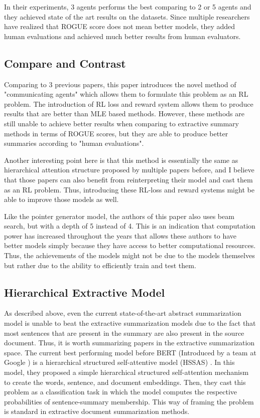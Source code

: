 \documentclass[11pt,a4paper]{article}
\begin{document}
In their experiments, 3 agents performs the best comparing to 2 or 5 agents and they achieved state of the art results on the datasets. Since multiple researchers have realized that ROGUE score does not mean better models, they added human evaluations and achieved much better results from human evaluators. 

\subsection{Compare and Contrast}
Comparing to 3 previous papers, this paper introduces the novel method of "communicating agents" which allows them to formulate this problem as an RL problem. The introduction of RL loss and reward system allows them to produce results that are better than MLE based methods. However, these methods are still unable to achieve better results when comparing to extractive summary methods in terms of ROGUE scores, but they are able to produce better summaries according to "human evaluations". 

Another interesting point here is that this method is essentially the same as hierarchical attention structure proposed by multiple papers before, and I believe that those papers can also benefit from reinterpreting their model and cast them as an RL problem. Thus, introducing these RL-loss and reward systems might be able to improve those models as well. 

Like the pointer generator model, the authors of this paper also uses beam search, but with a depth of 5 instead of 4. This is an indication that computation power has increased throughout the years that allows these authors to have better models simply because they have access to better computational resources. Thus, the achievements of the models might not be due to the models themselves but rather due to the ability to efficiently train and test them. 

\subsection{Hierarchical Extractive Model}
As described above, even the current state-of-the-art abstract summarization model is unable to beat the extractive summarization models due to the fact that most sentences that are present in the summary are also present in the source document. Thus, it is worth summarizing papers in the extractive summarization space. The current best performing model before BERT (Introduced by a team at Google  \cite{bert}) is a hierarchical structured self-attentive model (HSSAS) \cite{al2018hierarchical}. In this model, they proposed a simple hierarchical structured self-attention mechanism to create the words, sentence, and document embeddings. Then, they cast this problem as a classification task in which the model computes the respective probabilities of sentence-summary membership. This way of framing the problem is standard in extractive document summarization methods. 
\end{document}
